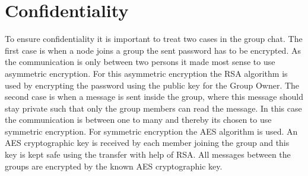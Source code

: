 \section{Confidentiality}
To ensure confidentiality it is important to treat two cases in the group chat. The first case is when a node joins a group the sent password has to be encrypted. As the communication is only between two persons it made most sense to use asymmetric encryption. For this asymmetric encryption the RSA algorithm is used by encrypting the password using the public key for the Group Owner.  
The second case is when a message is sent inside the group, where this message should stay private such that only the group members can read the message. In this case the communication is between one to many and thereby its chosen to use symmetric encryption. For symmetric  encryption the AES algorithm is used. An AES cryptographic key is received by each member joining the group and this key is kept safe using the transfer with help of RSA. All messages between the groups are encrypted by the known AES cryptographic key.  

%
%
%
